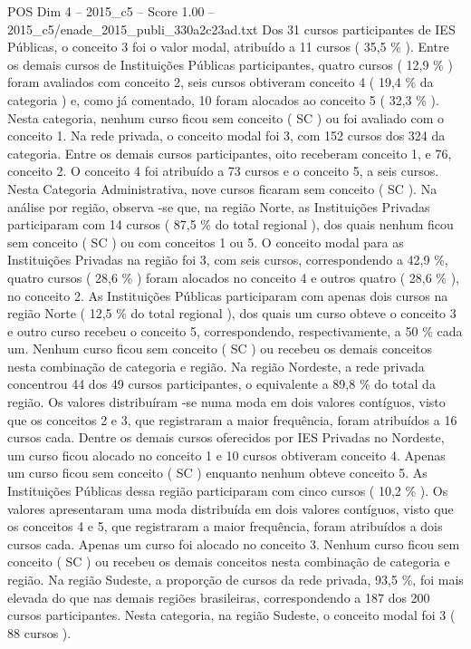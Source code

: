 \begin{textsample}{POS Dim 4 – 2015\_c5 – Score 1.00 – 2015\_c5/enade\_2015\_publi\_330a2c23ad.txt}
Dos 31 cursos participantes de IES Públicas, o conceito 3 foi o valor modal, atribuído a 11 cursos ( 35,5 \% ).
Entre os demais cursos de Instituições Públicas participantes, quatro cursos ( 12,9 \% ) foram avaliados com conceito 2, seis cursos obtiveram conceito 4 ( 19,4 \% da categoria ) e, como já comentado, 10 foram alocados ao conceito 5 ( 32,3 \% ).
Nesta categoria, nenhum curso ficou sem conceito ( SC ) ou foi avaliado com o conceito 1.
Na rede privada, o conceito modal foi 3, com 152 cursos dos 324 da categoria.
Entre os demais cursos participantes, oito receberam conceito 1, e 76, conceito 2.
O conceito 4 foi atribuído a 73 cursos e o conceito 5, a seis cursos.
Nesta Categoria Administrativa, nove cursos ficaram sem conceito ( SC ).
Na análise por região, observa -se que, na região Norte, as Instituições Privadas participaram com 14 cursos ( 87,5 \% do total regional ), dos quais nenhum ficou sem conceito ( SC ) ou com conceitos 1 ou 5.
O conceito modal para as Instituições Privadas na região foi 3, com seis cursos, correspondendo a 42,9 \%, quatro cursos ( 28,6 \% ) foram alocados no conceito 4 e outros quatro ( 28,6 \% ), no conceito 2.
As Instituições Públicas participaram com apenas dois cursos na região Norte ( 12,5 \% do total regional ), dos quais um curso obteve o conceito 3 e outro curso recebeu o conceito 5, correspondendo, respectivamente, a 50 \% cada um.
Nenhum curso ficou sem conceito ( SC ) ou recebeu os demais conceitos nesta combinação de categoria e região.
Na região Nordeste, a rede privada concentrou 44 dos 49 cursos participantes, o equivalente a 89,8 \% do total da região.
Os valores distribuíram -se numa moda em dois valores contíguos, visto que os conceitos 2 e 3, que registraram a maior frequência, foram atribuídos a 16 cursos cada.
Dentre os demais cursos oferecidos por IES Privadas no Nordeste, um curso ficou alocado no conceito 1 e 10 cursos obtiveram conceito 4.
Apenas um curso ficou sem conceito ( SC ) enquanto nenhum obteve conceito 5.
As Instituições Públicas dessa região participaram com cinco cursos ( 10,2 \% ).
Os valores apresentaram uma moda distribuída em dois valores contíguos, visto que os conceitos 4 e 5, que registraram a maior frequência, foram atribuídos a dois cursos cada.
Apenas um curso foi alocado no conceito 3.
Nenhum curso ficou sem conceito ( SC ) ou recebeu os demais conceitos nesta combinação de categoria e região.
Na região Sudeste, a proporção de cursos da rede privada, 93,5 \%, foi mais elevada do que nas demais regiões brasileiras, correspondendo a 187 dos 200 cursos participantes.
Nesta categoria, na região Sudeste, o conceito modal foi 3 ( 88 cursos ).

\end{textsample}
